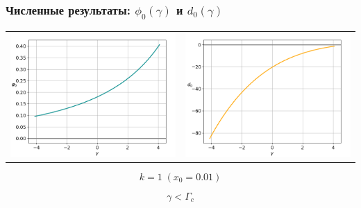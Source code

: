 \documentclass[fullscreen=true, unicode, bookmarks=false]{beamer}
\begin{document}
\begin{frame}
\frametitle{ Численные результаты: $ \phi_0(\gamma) $ и $ d_0(\gamma) $ }

\begin{center}
\begin{tabular}{cc}
\includegraphics[scale=0.32]{oscillating_phi0_000.png} &
\includegraphics[scale=0.32]{oscillating_d0_000.png} \\
\end{tabular}
\end{center}

\vfill

$$k=1 \; (x_0 =0.01) $$

$$ \gamma < \Gamma_c $$

\end{frame}
\end{document}
